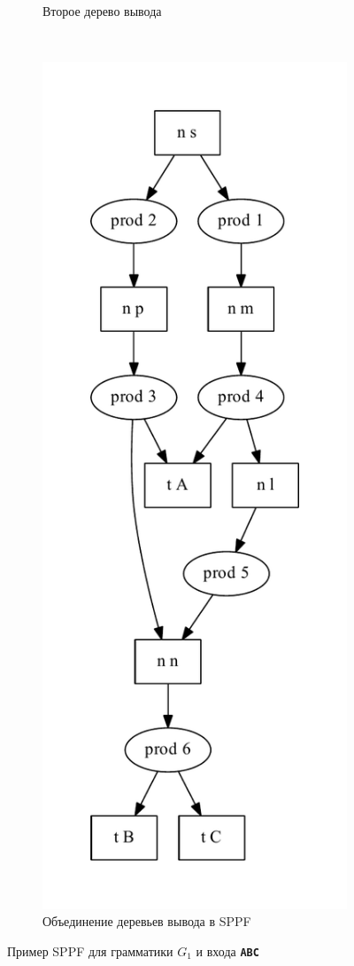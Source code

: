 \begin{figure}[h!]
\begin{subfigure}[b]{0.3\textwidth}
       \caption{Второе дерево вывода}
       \label{fig:ex_sppf2}
   \end{subfigure}
   ~
   \begin{subfigure}[b]{0.3\textwidth}
       \includegraphics[width=\textwidth]{pics/ex_sppf3}
       \caption{Объединение деревьев вывода в SPPF}
       \label{fig:ex_sppf3}
   \end{subfigure}
   \caption{Пример SPPF для грамматики $G_1$ и входа \textbf{\texttt{ABC}}}
   \label{fig:ex_sppf} 
\end{figure}

